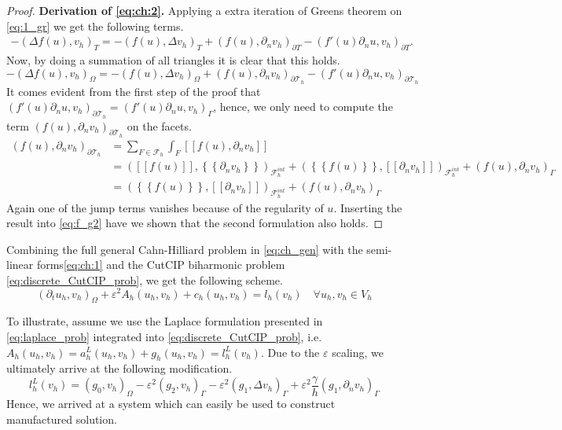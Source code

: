 \documentclass[11pt]{article}
\theoremstyle{remark}
\newcommand{\mean}[1]{\left\{\!\!\left\{#1\right\}\!\!\right\}}
\newcommand{\jump}[1]{\left[\!\left[ #1 \right]\!\right]}
\numberwithin{equation}{section}
\begin{document}
\begin{proof}
         \textbf{Derivation of \eqref{eq:ch:2}.  }  Applying a extra iteration of Greens theorem on \eqref{eq:1_gr} we get the following terms.
\[
    \begin{split}
-(\Delta f( u) , v_{h})_{T }  = -( f( u), \Delta v_{h} )_{T} + (f( u), \partial _{n} v_{h}  )_{\partial T} - (   f'( u)\partial _{n}u, v_{h} )_{\partial T } .
    \end{split}
\]
Now, by doing a summation of all triangles it is clear that this holds.
\begin{equation}
\label{eq:f_g2}
-(\Delta f( u) , v_{h})_{\Omega  }  = -( f( u), \Delta v_{h} )_{\Omega } + (f( u), \partial _{n} v_{h}  )_{\partial \mathcal{T}_{h} } - (   f'( u)\partial _{n}u, v_{h} )_{\partial \mathcal{T}_{h}  }
\end{equation}
It comes evident from the first step of the proof that $ (   f'( u)\partial _{n}u, v_{h} )_{\partial \mathcal{T}_{h}  } = (   f'( u)\partial _{n}u, v_{h} )_{\Gamma }$, hence, we only need to compute the term $(f( u), \partial _{n} v_{h}  )_{\partial
\mathcal{T}_{h} }$ on the facets. \[
    \begin{split}
(f( u), \partial _{n} v_{h}  )_{\partial
\mathcal{T}_{h} } & = \sum_{F\in \mathcal{F} _{h}}^{} \int_{F}^{}\jump{ f( u), \partial _{n} v_{h}  } \\
& =  (\jump{ f( u)  }  , \mean{ \partial _{n} v_{h} }    )_{ \mathcal{F}_{h}^{int} } +(\mean{ f( u)  }  , \jump{ \partial _{n} v_{h} }    )_{ \mathcal{F}_{h}^{int} } + (f( u), \partial _{n} v_{h}  )_{\Gamma } \\
&=  (\mean{ f( u)  }  , \jump{ \partial _{n} v_{h} }    )_{ \mathcal{F}_{h}^{int} } + (f( u), \partial _{n} v_{h}  )_{\Gamma }
    \end{split}
\]
Again one of the jump terms vanishes because of the regularity of $u$.
Inserting the result into \eqref{eq:f_g2} have we shown that the second formulation also holds.
\end{proof}


Combining the full general Cahn-Hilliard problem in \eqref{eq:ch_gen} with the semi-linear forms\eqref{eq:ch:1} and the CutCIP biharmonic problem \eqref{eq:discrete_CutCIP_prob}, we get the following scheme.
\begin{equation}
    ( \partial _{t}u_{h}, v_{h})_\Omega + \varepsilon^2  A_{h}( u_{h},v_{h}) + c_{h}( u_{h},v_{h})   =   l_{h}(v_{h}) \quad  \forall u_{h}, v_{h} \in V_{h}
\end{equation}

To illustrate, assume we use the Laplace formulation presented in \eqref{eq:laplace_prob} integrated into \eqref{eq:discrete_CutCIP_prob}, i.e. $A_{h}( u_{h}, v_{h}) = a^{L}_{h}( u_{h}, v_{h}) + g_{h}( u_{h}, v_{h})   = l_{h}^{L}( v_{h})$. Due to the $\varepsilon $ scaling, we ultimately
arrive at the following modification.
 \begin{equation}
    l_{h}^{L}( v_{h})  =  \left( g_{0}, v_{h} \right) _{\Omega } -  \varepsilon^2 ( g_{2},  v_{h} )_{\Gamma }  -  \varepsilon^2 ( g_{1}, \Delta  v_{h}  )_{\Gamma }  + \varepsilon^2 \frac{\gamma }{h} ( g_{1}, \partial _{n} v_{h}  )_{\Gamma }
 \end{equation}
 Hence, we arrived at a system which can easily be used to construct manufactured solution.
\end{document}
